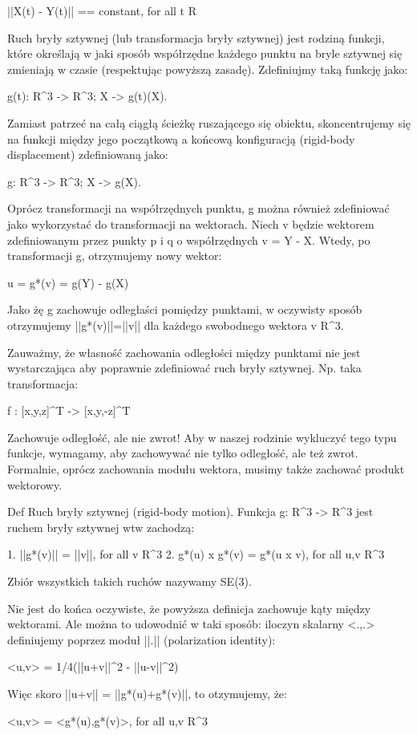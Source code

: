||X(t) - Y(t)|| == constant, for all t \in R

Ruch bryły sztywnej (lub transformacja bryły sztywnej) jest rodziną funkcji, które określają w jaki sposób współrzędne każdego punktu na bryle sztywnej się zmieniają w czasie (respektując powyższą zasadę). Zdefiniujmy taką funkcję jako:

g(t): R^3 -> R^3; X -> g(t)(X).

Zamiast patrzeć na całą ciągłą ścieżkę ruszającego się obiektu, skoncentrujemy się na funkcji między jego początkową a końcową konfiguracją (rigid-body displacement) zdefiniowaną jako:

g: R^3 -> R^3; X -> g(X).

Oprócz transformacji na współrzędnych punktu, g można również zdefiniować jako wykorzystać do transformacji na wektorach. Niech v będzie wektorem zdefiniowanym przez punkty p i q o współrzędnych v = Y - X. Wtedy, po transformacji g, otrzymujemy nowy wektor:

u = g*(v) = g(Y) - g(X)

Jako żę g zachowuje odległaści pomiędzy punktami, w oczywisty sposób otrzymujemy ||g*(v)||=||v|| dla każdego swobodnego wektora v \in R^3.

Zauważmy, że własność zachowania odległości między punktami nie jest wystarczająca aby poprawnie zdefiniować ruch bryły sztywnej. Np. taka transformacja:

f : [x,y,z]^T -> [x,y,-z]^T

Zachowuje odległość, ale nie zwrot! Aby w naszej rodzinie wykluczyć tego typu funkcje, wymagamy, aby zachowywać nie tylko odległość, ale też zwrot. Formalnie, oprócz zachowania modułu wektora, musimy także zachować produkt wektorowy.

Def Ruch bryły sztywnej (rigid-body motion). Funkcja g: R^3 -> R^3 jest ruchem bryły sztywnej wtw zachodzą:

1. ||g*(v)|| = ||v||, for all v \in R^3
2. g*(u) x g*(v) = g*(u x v), for all u,v \in R^3

Zbiór wszystkich takich ruchów nazywamy SE(3).

Nie jest do końca oczywiste, że powyższa definicja zachowuje kąty między wektorami. Ale można to udowodnić w taki sposób: iloczyn skalarny <.,.> definiujemy poprzez moduł ||.|| (polarization identity):

<u,v> = 1/4(||u+v||^2 - ||u-v||^2)

Więc skoro ||u+v|| = ||g*(u)+g*(v)||, to otzymujemy, że:

<u,v> = <g*(u),g*(v)>, for all u,v \in R^3

